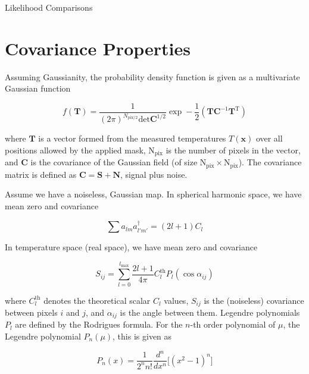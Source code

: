 \documentclass[a4paper, 11pt]{article}
\begin{document}

{\huge Likelihood Comparisons}

\section*{Covariance Properties}



Assuming Gaussianity, the probability density function is given as a multivariate Gaussian function

\begin{equation}
f(\textbf{T}) = \frac{1}{(2\pi)^{N_{\text{pix}/2}} \text{det}\textbf{C}^{1/2}}\exp-\frac{1}{2}(\textbf{T}\textbf{C}^{-1}\textbf{T}^{\text{T}})
\end{equation}

where $\textbf{T}$ is a vector formed from the measured temperatures $T(\textbf{x})$ over all positions allowed by the applied mask, $\text{N}_{\text{pix}}$ is the number of pixels in the vector, and $\textbf{C}$ is the covariance of the Gaussian field (of size $\text{N}_{\text{pix}}\times\text{N}_{\text{pix}}$). The covariance matrix is defined as $\textbf{C}=\textbf{S}+\textbf{N}$, signal plus noise. 

Assume we have a noiseless, Gaussian map. In spherical harmonic space, we have mean zero and covariance 

\begin{equation}
\sum a_{lm} a^{\dagger}_{l'm'} = (2l+1)C_l
\end{equation}

In temperature space (real space), we have mean zero and covariance

\begin{equation}
S_{ij}=\sum_{l=0}^{l_\text{max}}\frac{2l+1}{4\pi}C^{\text{th}}_l P_l (\cos\alpha_{ij})
\end{equation}

where $C^{\text{th}}_l$ denotes the theoretical scalar $C_l$ values, $S_{ij}$ is the (noiseless) covariance between pixels $i$ and $j$, and $\alpha_{ij}$ is the angle between them. Legendre polynomials $P_l$ are defined by the Rodrigues formula. For the $n$-th order polynomial of $\mu$, the Legendre polynomial $P_n(\mu)$, this is given as

\begin{equation}
P_n(x)=\frac{1}{2^n n!} \frac{d^n}{dx^n} \big[ (x^2-1)^n \big]
\end{equation}
\end{document}
